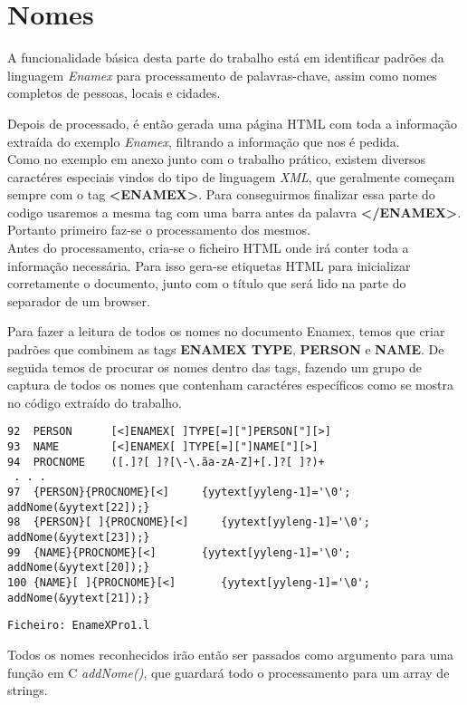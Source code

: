 \documentclass[11pt,a4paper]{report}
\begin{document}
\section{Nomes}

A funcionalidade básica desta parte do trabalho está em identificar padrões da linguagem \textit{Enamex} para processamento de palavras-chave, assim como nomes completos de pessoas, locais e cidades.

Depois de processado, é então gerada uma página HTML com toda a informação extraída do exemplo \textit{Enamex}, filtrando a informação que nos é pedida.
~\\
Como no exemplo em anexo junto com o trabalho prático, existem diversos caractéres especiais vindos do tipo de linguagem \textit{XML}, que geralmente começam sempre com o tag \textbf{<ENAMEX>}. Para conseguirmos finalizar essa parte do codigo usaremos a mesma tag com uma barra antes da palavra \textbf{</ENAMEX>}. Portanto primeiro faz-se o processamento dos mesmos.
\\
Antes do processamento, cria-se o ficheiro HTML onde irá conter toda a informação necessária. Para isso gera-se etiquetas HTML para inicializar corretamente o documento, junto com o título que será lido na parte do separador de um browser.

Para fazer a leitura de todos os nomes no documento Enamex, temos que criar padrões que combinem as tags \textbf{ENAMEX TYPE}, \textbf{PERSON} e \textbf{NAME}. De seguida temos de procurar os nomes dentro das tags, fazendo um grupo de captura de todos os nomes que contenham caractéres específicos como se mostra no código extraído do trabalho.
\\
\begin{verbatim}
92  PERSON      [<]ENAMEX[ ]TYPE[=]["]PERSON["][>]
93  NAME        [<]ENAMEX[ ]TYPE[=]["]NAME["][>]
94  PROCNOME    ([.]?[ ]?[\-\.ãa-zA-Z]+[.]?[ ]?)+ 
 . . .
97  {PERSON}{PROCNOME}[<]     {yytext[yyleng-1]='\0'; addNome(&yytext[22]);}
98  {PERSON}[ ]{PROCNOME}[<]     {yytext[yyleng-1]='\0'; addNome(&yytext[23]);}
99  {NAME}{PROCNOME}[<]       {yytext[yyleng-1]='\0'; addNome(&yytext[20]);}
100 {NAME}[ ]{PROCNOME}[<]       {yytext[yyleng-1]='\0'; addNome(&yytext[21]);}
\end{verbatim}
\begin{flushright}
\texttt{Ficheiro: EnameXPro1.l}
\end{flushright}


Todos os nomes reconhecidos irão então ser passados como argumento para uma função em C \emph{addNome()}, que guardará todo o processamento para um array de strings.
\end{document}
